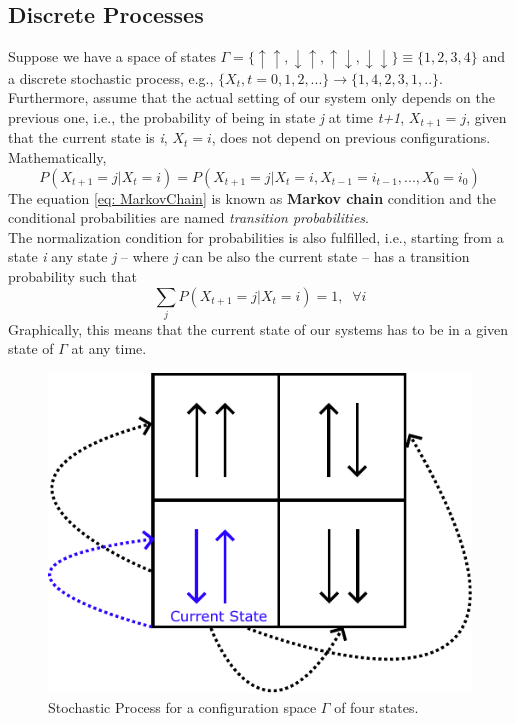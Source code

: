 \subsection{Discrete Processes}
Suppose we have a space of states $\Gamma = \{\uparrow \uparrow,\downarrow \uparrow,\uparrow \downarrow,\downarrow \downarrow \} \equiv \{1, 2, 3, 4 \}$ and a discrete stochastic process, e.g., $\{X_{t}, t= 0,1,2,...\} \rightarrow \{1,4,2,3,1,..\}$. Furthermore, assume that the actual setting of our system only depends on the previous one, i.e., the probability of being in state \textit{j} at time \textit{t+1}, $X_{t+1}= j$, given that the current state is \textit{i}, $X_{t} = i$, does not depend on previous configurations.\\
Mathematically,
\begin{equation}
\label{eq: MarkovChain}
    P\left(X_{t+1} = j | X_{t} = i\right) = P\left(X_{t+1}=j | X_{t} = i, X_{t-1} =i_{t-1},...,X_{0} = i_{0}\right)
\end{equation}
The equation \ref{eq: MarkovChain} is known as \textbf{Markov chain} condition and the conditional probabilities are named \textit{transition probabilities}.\\
The normalization condition for probabilities is also fulfilled, i.e., starting from a state  \textit{i} any state \textit{j} -- where \textit{j} can be also the current state -- has a transition probability such that
\begin{equation}
    \sum_{j}P\left(X_{t+1} = j | X_{t} = i\right) = 1, \;\; \forall i
\end{equation}
Graphically, this means that the current state of our systems has to be in a given state of $\Gamma$ at any time.
\begin{figure}[H]
    \centering
    \includegraphics[scale=0.65]{Figures/SA_StateJump.pdf}
    \caption{Stochastic Process for a configuration space $\Gamma$ of four states.}
    \label{fig:SimulatedAnneling_StatesJump}
\end{figure}
